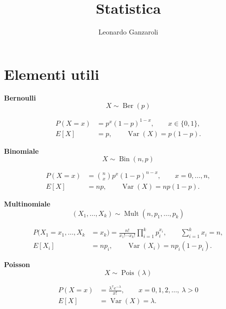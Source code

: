 \documentclass{article}
\title{Statistica}
\author{Leonardo Ganzaroli}
\date{}
\begin{document}
\maketitle

\tableofcontents

\newpage

\hypersetup{allcolors=black}


\section{Elementi utili}

\noindent\textbf{Bernoulli} \[ \boxed{X\sim \operatorname{Ber}(p)} \]

\[
\begin{aligned}
P(X=x)
&=
p^x(1-p)^{1-x},
\qquad x\in\{0,1\},
\\[0.5em]
E[X]
&=
p,
\qquad
\operatorname{Var}(X)=p(1-p).
\end{aligned}
\]

\medskip

\noindent\textbf{Binomiale} \[ \boxed{X\sim \operatorname{Bin}(n,p)} \]

\[
\begin{aligned}
P(X=x)
&=
\binom{n}{x}p^x(1-p)^{n-x},
\qquad x=0,\ldots,n,
\\[0.5em]
E[X]
&=
np,
\qquad
\operatorname{Var}(X)=np(1-p).
\end{aligned}
\]

\medskip

\noindent\textbf{Multinomiale} \[ \boxed{ (X_1,\ldots,X_k) \sim \operatorname{Mult}(n,p_1,\ldots,p_k) } \]

\[
\begin{aligned}
P(X_1=x_1,\ldots,X_k&=x_k)
=
\frac{n!}{x_1!\cdots x_k!}
\prod_{i=1}^{k}p_i^{x_i},
\qquad
\sum_{i=1}^{k}x_i=n,
\\[0.5em]
E[X_i]
&=
np_i,\qquad
\operatorname{Var}(X_i)
=
np_i(1-p_i).
\end{aligned}
\]

\medskip

\noindent\textbf{Poisson} \[ \boxed{X\sim\operatorname{Pois}(\lambda)} \]

\[
\begin{aligned}
P(X=x)
&=
\frac{\lambda^x e^{-\lambda}}{x!},
\qquad x=0,1,2,\ldots,\ \lambda>0
\\[0.5em]
E[X]
&=
\operatorname{Var}(X)=\lambda.
\end{aligned}
\]

\medskip
\end{document}
